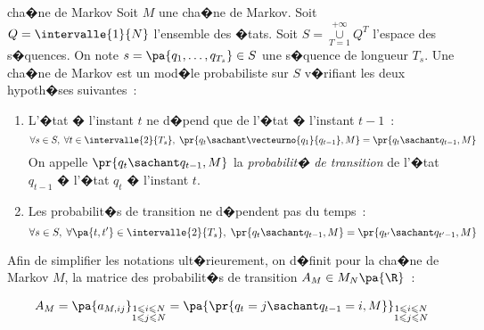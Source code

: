         \begin{xdefinition}{cha�ne de Markov}
        \label{markov_chaine_definition}%
        Soit $M$ une cha�ne de Markov.\newline
        Soit $Q = \intervalle{1}{N}$ l'ensemble des �tats.\newline
        Soit $S=\underset{T=1} {\overset{+\infty}{\cup}} Q^T$ l'espace des s�quences.\newline
        On note $s = \pa{q_1,\dots,q_{T_s}} \in S$ une s�quence de longueur $T_s$.\newline
        Une cha�ne de Markov est un mod�le probabiliste sur $S$ v�rifiant les deux hypoth�ses suivantes~:
                \begin{enumerate}
                \item L'�tat � l'instant $t$ ne d�pend que de l'�tat � l'instant $t-1$~:
                    $$
                    \forall s \in S, \; \forall t \in \intervalle{2}{T_s}, \; 
                                \pr{q_t \sachant \vecteurno{q_1}{q_{t-1}},M} = \pr{q_t \sachant q_{t-1},M}
                    $$
                    On appelle $\pr{q_t \sachant q_{t-1},M}$ la \emph{probabilit� de transition}
                    de l'�tat $q_{t-1}$ � l'�tat $q_t$ � l'instant $t$.
                \item Les probabilit�s de transition ne d�pendent pas du temps~:
                    $$
                    \forall s \in S, \; \forall \pa{t,t'} \in \intervalle{2}{T_s}, \; 
                                \pr{q_t \sachant q_{t-1},M} = \pr{q_{t'} \sachant q_{t'-1},M}
                    $$
                \end{enumerate}
        \end{xdefinition}



Afin de simplifier les notations ult�rieurement, on d�finit pour la cha�ne de Markov $M$, la matrice des probabilit�s de transition $A_M \in M_N\pa{\R}$~: 

        \begin{eqnarray}
        A_{M}=  \pa {  a_{M,ij} }                              _{\substack{1\leqslant i\leqslant N\\1\leqslant j\leqslant N}} =
                \pa{  \pr{  q_{t}=j \sachant q_{t-1} =i,M } }  _{\substack{1\leqslant i\leqslant N\\1\leqslant j\leqslant N}}
        \label{hmm_eq_1}
        \end{eqnarray}


